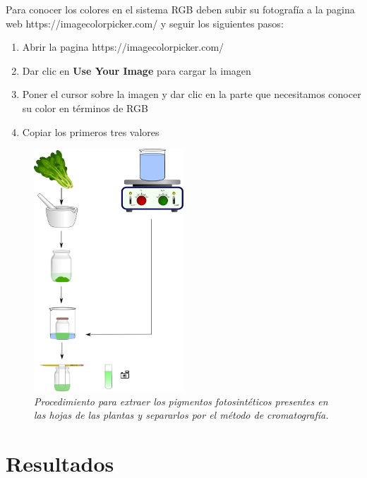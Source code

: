 Para conocer los colores en el sistema RGB deben subir su fotograf\'ia a la pagina web https://imagecolorpicker.com/ y seguir los siguientes pasos:

\begin{enumerate}
	\item Abrir la pagina https://imagecolorpicker.com/ 
	\item Dar clic en \textbf{Use Your Image} para cargar la imagen
	\item Poner el cursor sobre la imagen y dar clic en la parte que necesitamos conocer su color en t\'erminos de RGB
	\item Copiar los primeros tres valores 
\end{enumerate}


\begin{figure}[h]
	
	\begin{leftbar}
		
		\includegraphics[width=0.5\textwidth]{cromatofrafia.png}
		\centering
		\caption{\textit{Procedimiento para extraer los pigmentos fotosint\'eticos presentes en las hojas de las plantas y separarlos por el m\'etodo de cromatograf\'ia.}}
		\label{fig:cromatografia}
		
	\end{leftbar}
	
\end{figure}

\section{Resultados}

